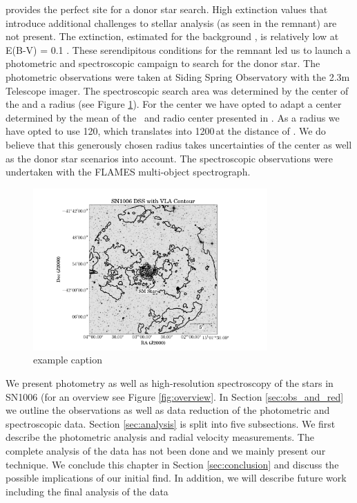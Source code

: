  provides the perfect site for a donor star search. High extinction values that introduce additional challenges to stellar analysis (as seen in the  remnant) are not present. The extinction, estimated for the background \smstar, is relatively low  at E(B-V) = 0.1 \citep{1993ApJ...416..247W,2003ApJ...585..324W}. These serendipitous conditions for the  remnant led us to launch a photometric and spectroscopic campaign to search for the donor star. The photometric observations were taken at Siding Spring Observatory with the 2.3m Telescope imager. The spectroscopic search area was determined by the center of the  and a radius (see Figure \ref{fig:overview_sn1006}). For the center we have opted to adapt a center determined by the mean of the \xray\ and radio center presented in \citet{2003ApJ...585..324W}. As a radius we have opted to use 120\arcsec, which translates into 1200\,\kms at the distance of . We do believe that this generously chosen radius takes uncertainties of the center as well as the donor star scenarios into account. The spectroscopic observations were undertaken with the FLAMES multi-object spectrograph.

\begin{figure}[htbp] %
   \centering
   \includegraphics[width=0.8\textwidth]{chapter_sn1006/plots/sn1006_overlay_withsm.pdf} 
   \caption{example caption}
   \label{fig:overview_sn1006}
\end{figure}

We present photometry as well as high-resolution spectroscopy of the stars in SN1006 (for an overview see Figure \ref{fig:overview}. In Section \ref{sec:obs_and_red} we outline the observations as well as data reduction of the photometric and spectroscopic data. Section \ref{sec:analysis} is split into five subsections. We first describe the photometric analysis and radial velocity measurements. The complete analysis of the data has not been done and we mainly present our technique. We conclude this chapter in Section \ref{sec:conclusion} and discuss the possible implications of our initial find. In addition, we will describe future work including the final analysis of the data 



